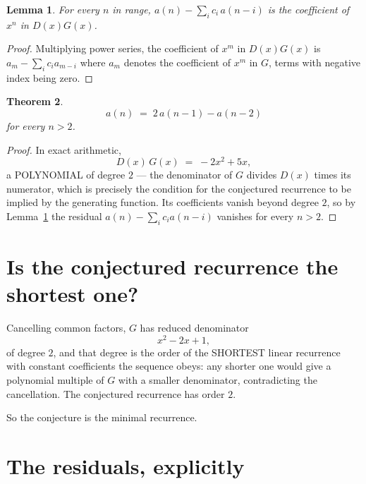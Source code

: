 \documentclass[11pt,a4paper]{article}
\theoremstyle{plain}
\newtheorem{theorem}{Theorem}
\newtheorem{lemma}[theorem]{Lemma}
\theoremstyle{definition}
\begin{document}
\begin{lemma}\label{lem:key}
For every $n$ in range, $a(n)-\sum_i c_i\,a(n-i)$ is the coefficient of $x^{n}$ in
$D(x)G(x)$.
\end{lemma}

\begin{proof}
Multiplying power series, the coefficient of $x^{m}$ in $D(x)G(x)$ is
$a_m-\sum_i c_i a_{m-i}$ where $a_m$ denotes the coefficient of $x^{m}$ in $G$, terms with
negative index being zero.
\end{proof}

\begin{theorem}
\[
a(n)\;=\;2\,a(n-1) - a(n-2)
\]
for every $n>2$.
\end{theorem}

\begin{proof}
In exact arithmetic,
\[
D(x)\,G(x)\;=\;- 2 x^{2} + 5 x,
\]
a POLYNOMIAL of degree $2$ --- the denominator of $G$ divides $D(x)$ times its numerator,
which is precisely the condition for the conjectured recurrence to be implied by the
generating function. Its coefficients vanish beyond degree $2$, so by
Lemma~\ref{lem:key} the residual $a(n)-\sum_ic_ia(n-i)$ vanishes for every
$n>2$.
\end{proof}

\section{Is the conjectured recurrence the shortest one?}

Cancelling common factors, $G$ has reduced denominator
\[
x^{2} - 2 x + 1,
\]
of degree $2$, and that degree is the order of the SHORTEST linear recurrence with
constant coefficients the sequence obeys: any shorter one would give a polynomial multiple of
$G$ with a smaller denominator, contradicting the cancellation. The conjectured recurrence has
order $2$.

So the conjecture is the minimal recurrence.

\section{The residuals, explicitly}
\end{document}

